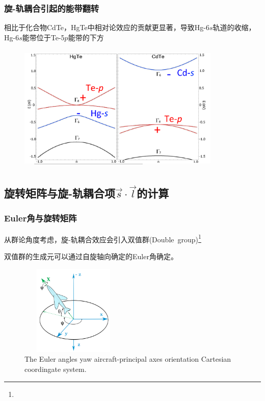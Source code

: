 {\frame
{
	\frametitle{旋-轨耦合引起的能带翻转}
	相比于化合物\textrm{CdTe}，\textrm{HgTe}中相对论效应的贡献更显著，导致\textrm{Hg}-\textrm{6}$s$轨道的收缩，\textrm{Hg}-\textrm{6}$s$能带位于\textrm{Te}-\textrm{5}$p$能带的下方
	\begin{figure}[h!]
\centering
\vspace*{-0.05in}
\includegraphics[height=2.4in,width=3.80in,viewport=0 5 1350 830,clip]{Figures/SOC_double-group_2.png}
\label{Fig:Relativistic-Effect}
\end{figure}
}

\subsection{旋转矩阵与旋-轨耦合项$\vec s\cdot\vec l$的计算}
\frame
{
	\frametitle{\textrm{Euler}角与旋转矩阵}
	从群论角度考虑，旋-轨耦合效应会引入双值群\textrm{(Double~group)}\footnote{\fontsize{5.2pt}{6.2pt}}

	双值群的生成元可以通过自旋轴向确定的\textrm{Euler}角确定。

	{\fontsize{6.5pt}{4.2pt}}
	\begin{figure}[h!]
\centering
\vspace*{-0.21in}
\hspace*{-0.1in}
\includegraphics[height=1.7in,width=2.0in,viewport=2 5 1162 1180,clip]{Figures/euler-angles-yaw-aircraft-principal-axes-orientation-cartesian-coordinate-system.png}
\caption{\tiny \textrm{The Euler angles yaw aircraft-principal axes orientation Cartesian coordingate system.}}%
\label{Fig:Euler}
\end{figure}
}

}
